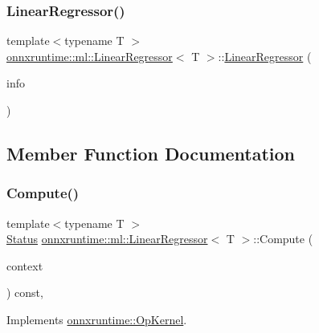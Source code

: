 \subsubsection{\texorpdfstring{Linear\+Regressor()}{LinearRegressor()}}
{\footnotesize\ttfamily template$<$typename T $>$ \\
\mbox{\hyperlink{classonnxruntime_1_1ml_1_1LinearRegressor}{onnxruntime\+::ml\+::\+Linear\+Regressor}}$<$ T $>$\+::\mbox{\hyperlink{classonnxruntime_1_1ml_1_1LinearRegressor}{Linear\+Regressor}} (\begin{DoxyParamCaption}\item[{const \mbox{\hyperlink{classonnxruntime_1_1OpKernelInfo}{Op\+Kernel\+Info}} \&}]{info }\end{DoxyParamCaption})}



\subsection{Member Function Documentation}
\mbox{\label{classonnxruntime_1_1ml_1_1LinearRegressor_a1766b7b9069ec2da7d24e09acf7f259d}} 
\subsubsection{\texorpdfstring{Compute()}{Compute()}\hspace{0.1cm}{\footnotesize\ttfamily [1/2]}}
{\footnotesize\ttfamily template$<$typename T $>$ \\
\mbox{\hyperlink{classonnxruntime_1_1common_1_1Status}{Status}} \mbox{\hyperlink{classonnxruntime_1_1ml_1_1LinearRegressor}{onnxruntime\+::ml\+::\+Linear\+Regressor}}$<$ T $>$\+::Compute (\begin{DoxyParamCaption}\item[{\mbox{\hyperlink{classonnxruntime_1_1OpKernelContext}{Op\+Kernel\+Context}} $\ast$}]{context }\end{DoxyParamCaption}) const\hspace{0.3cm}{\ttfamily [override]}, {\ttfamily [virtual]}}



Implements \mbox{\hyperlink{classonnxruntime_1_1OpKernel_a9eca8656a78b1b3ab9d3351a12798650}{onnxruntime\+::\+Op\+Kernel}}.

